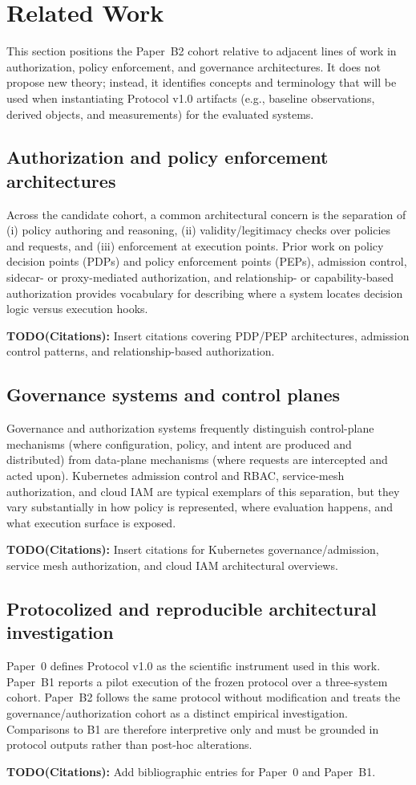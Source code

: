 \section{Related Work}
\label{sec:related-work}
This section positions the Paper~B2 cohort relative to adjacent lines of work in authorization, policy enforcement, and governance architectures. It does not propose new theory; instead, it identifies concepts and terminology that will be used when instantiating Protocol v1.0 artifacts (e.g., baseline observations, derived objects, and measurements) for the evaluated systems.

\subsection{Authorization and policy enforcement architectures}
Across the candidate cohort, a common architectural concern is the separation of (i) policy authoring and reasoning, (ii) validity/legitimacy checks over policies and requests, and (iii) enforcement at execution points. Prior work on policy decision points (PDPs) and policy enforcement points (PEPs), admission control, sidecar- or proxy-mediated authorization, and relationship- or capability-based authorization provides vocabulary for describing where a system locates decision logic versus execution hooks.

\textbf{TODO(Citations):} Insert citations covering PDP/PEP architectures, admission control patterns, and relationship-based authorization.

\subsection{Governance systems and control planes}
Governance and authorization systems frequently distinguish control-plane mechanisms (where configuration, policy, and intent are produced and distributed) from data-plane mechanisms (where requests are intercepted and acted upon). Kubernetes admission control and RBAC, service-mesh authorization, and cloud IAM are typical exemplars of this separation, but they vary substantially in how policy is represented, where evaluation happens, and what execution surface is exposed.

\textbf{TODO(Citations):} Insert citations for Kubernetes governance/admission, service mesh authorization, and cloud IAM architectural overviews.

\subsection{Protocolized and reproducible architectural investigation}
Paper~0 defines Protocol v1.0 as the scientific instrument used in this work. Paper~B1 reports a pilot execution of the frozen protocol over a three-system cohort. Paper~B2 follows the same protocol without modification and treats the governance/authorization cohort as a distinct empirical investigation. Comparisons to B1 are therefore interpretive only and must be grounded in protocol outputs rather than post-hoc alterations.

\textbf{TODO(Citations):} Add bibliographic entries for Paper~0 and Paper~B1.
